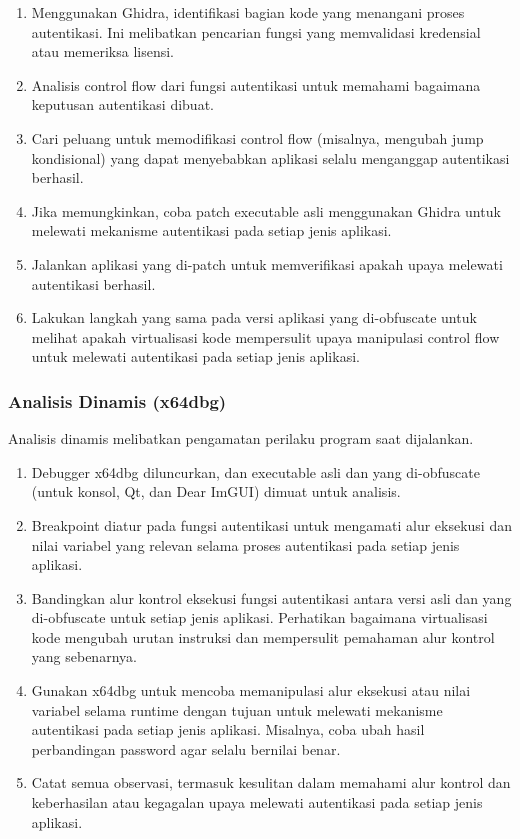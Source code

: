 \begin{enumerate}
	\item {} Menggunakan Ghidra, identifikasi bagian kode yang menangani proses autentikasi. Ini melibatkan pencarian fungsi yang memvalidasi kredensial atau memeriksa lisensi.
	\item {} Analisis control flow dari fungsi autentikasi untuk memahami bagaimana keputusan autentikasi dibuat.
	\item {} Cari peluang untuk memodifikasi control flow (misalnya, mengubah jump kondisional) yang dapat menyebabkan aplikasi selalu menganggap autentikasi berhasil.
	\item {} Jika memungkinkan, coba patch executable asli menggunakan Ghidra untuk melewati mekanisme autentikasi pada setiap jenis aplikasi.
	\item {} Jalankan aplikasi yang di-patch untuk memverifikasi apakah upaya melewati autentikasi berhasil.
	\item {} Lakukan langkah yang sama pada versi aplikasi yang di-obfuscate untuk melihat apakah virtualisasi kode mempersulit upaya manipulasi control flow untuk melewati autentikasi pada setiap jenis aplikasi.
\end{enumerate}

\subsubsection{Analisis Dinamis (x64dbg)}
Analisis dinamis melibatkan pengamatan perilaku program saat dijalankan.
\begin{enumerate}
	\item {} Debugger x64dbg diluncurkan, dan executable asli dan yang di-obfuscate (untuk konsol, Qt, dan Dear ImGUI) dimuat untuk analisis.
	\item {} Breakpoint diatur pada fungsi autentikasi untuk mengamati alur eksekusi dan nilai variabel yang relevan selama proses autentikasi pada setiap jenis aplikasi.
	\item {} Bandingkan alur kontrol eksekusi fungsi autentikasi antara versi asli dan yang di-obfuscate untuk setiap jenis aplikasi. Perhatikan bagaimana virtualisasi kode mengubah urutan instruksi dan mempersulit pemahaman alur kontrol yang sebenarnya.
	\item {} Gunakan x64dbg untuk mencoba memanipulasi alur eksekusi atau nilai variabel selama runtime dengan tujuan untuk melewati mekanisme autentikasi pada setiap jenis aplikasi. Misalnya, coba ubah hasil perbandingan password agar selalu bernilai benar.
	\item {} Catat semua observasi, termasuk kesulitan dalam memahami alur kontrol dan keberhasilan atau kegagalan upaya melewati autentikasi pada setiap jenis aplikasi.
\end{enumerate}

